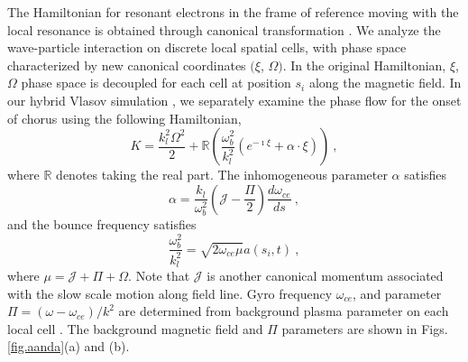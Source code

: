 The Hamiltonian for resonant electrons in the frame of reference moving with the local resonance is obtained through canonical transformation \cite{zheng2024}. We analyze the wave-particle interaction on discrete local spatial cells, with phase space characterized by new canonical coordinates $(\xi$, $\Omega)$. In the original Hamiltonian, $\xi$, $\Omega$ phase space is decoupled for each cell at position $s_i$ along the magnetic field. In our hybrid Vlasov simulation \cite{zheng2023b,zheng2024}, we separately examine the phase flow for the onset of chorus using the following Hamiltonian,
\begin{equation}\label{eq.H_lab}
    K = \frac{k_l^2\Omega^2}{2} + \mathbb{R}\left(\frac{\omega_b^2}{k_l^2} (e^{-\imath \xi} + \alpha \cdot \xi) \right)~,
\end{equation}
where $\mathbb{R}$ denotes taking the real part.
The inhomogeneous parameter $\alpha$ satisfies
\begin{equation}\label{eq.alpold}
   \alpha  = \frac{k_l}{\omega_b^2}(\mathcal{J} - \frac{\Pi}{2}) \frac{d\omega_{ce}}{ds}~,
\end{equation}
and the bounce frequency satisfies
\begin{equation}
    \frac{\omega_b^2}{k_l^2} = \sqrt{2\omega_{ce}\mu}a(s_i,t)~,
\end{equation}
where $\mu = \mathcal{J}+\Pi+\Omega$. 
Note that $\mathcal{J}$ is another canonical momentum associated with the slow scale motion along field line. Gyro frequency $\omega_{ce}$, and parameter $\Pi = (\omega - \omega_{ce})/k^2$ are determined from background plasma parameter on each local cell \cite{zheng2024,zheng2023b}. The background magnetic field and $\Pi$ parameters are shown in Figs. \ref{fig.aanda}(a) and (b).

